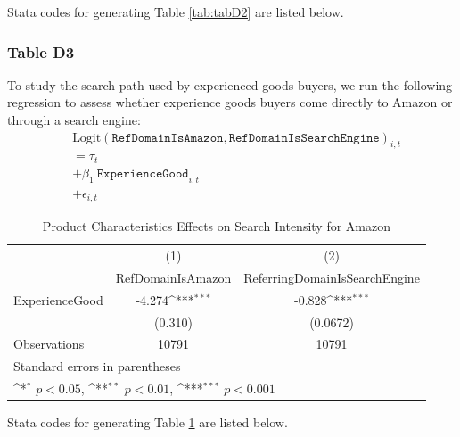 \documentclass{article}
\begin{document}
Stata codes for generating Table \ref{tab:tabD2} are listed below.

\pagebreak

\subsubsection{Table D3}
To study the search path used by experienced goods buyers, we run the following regression to assess whether experience goods buyers come directly to Amazon or through a search engine:
\begin{equation}
	\begin{aligned}
		& \textrm{Logit}\left( \texttt{RefDomainIsAmazon}, \texttt{RefDomainIsSearchEngine}\right)_{i,t} \\ &= \tau_{t} 
		\\ &+ \beta_1 \ \texttt{ExperienceGood}_{i,t} 
		\\ & + \epsilon_{i,t}
	\end{aligned}
\end{equation}
\begin{table}[!h]\centering
	\def\sym#1{\ifmmode^{#1}\else\(^{#1}\)\fi}
	\caption{Product Characteristics Effects on Search Intensity for Amazon}
	\label{tab:tabD3}
	\begin{tabular}{l*{2}{c}}
		\\[-1.8ex]\hline 
		\hline
		&\multicolumn{1}{c}{(1)}&\multicolumn{1}{c}{(2)}\\
		&\multicolumn{1}{c}{RefDomainIsAmazon}&\multicolumn{1}{c}{ReferringDomainIsSearchEngine}\\
		\midrule
		ExperienceGood      &      -4.274\sym{***}&      -0.828\sym{***}\\
		&     (0.310)         &    (0.0672)         \\
		\midrule
		Observations        &       10791         &       10791         \\
		\bottomrule
		\multicolumn{3}{l}{\footnotesize Standard errors in parentheses}\\
		\multicolumn{3}{l}{\footnotesize \sym{*} \(p<0.05\), \sym{**} \(p<0.01\), \sym{***} \(p<0.001\)}\\
	\end{tabular}
\end{table}

Stata codes for generating Table \ref{tab:tabD3} are listed below.

\pagebreak
\end{document}
